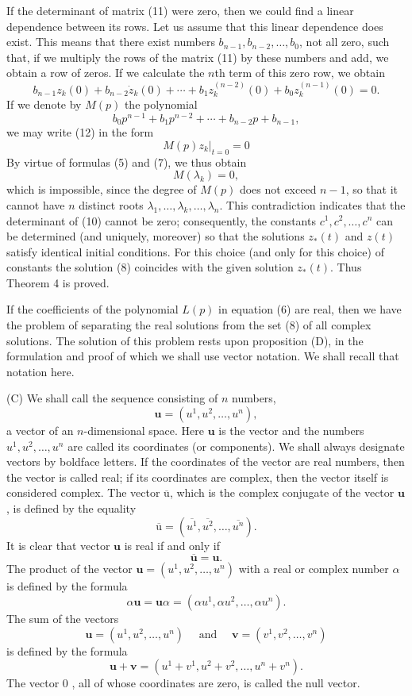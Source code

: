 \documentclass[10pt,a5paper]{book}
\makeatletter
\theoremstyle{plain}
\theoremstyle{definition}
\theoremstyle{remark}
\renewenvironment{proof}[1][\proofname]{\par
  \pushQED{\qed}%
  \normalfont\topsep6\p@\@plus6\p@\relax
  \trivlist
  \item\relax{\itshape #1\@addpunct{.}}\hspace\labelsep\ignorespaces
}{\popQED\endtrivlist\@endpefalse}
\makeatother
\begin{document}
\begin{proof}
If the determinant of matrix (11) were zero, then we could find a linear dependence between its rows. Let us assume that this linear dependence does exist. This means that there exist numbers $b_{n-1}, b_{n-2}, \ldots, b_{0}$, not all zero, such that, if we multiply the rows of the matrix (11) by these numbers and add, we obtain a row of zeros. If we calculate the $n$th term of this zero row, we obtain
\begin{equation*}
b_{n-1} z_{k}(0)+b_{n-2} \dot{z}_{k}(0)+\cdots+b_{1} z_{k}^{(n-2)}(0)+b_{0} z_{k}^{(n-1)}(0)=0 . \tag{12}
\end{equation*}
If we denote by $M(p)$ the polynomial
\[
b_{0} p^{n-1}+b_{1} p^{n-2}+\cdots+b_{n-2} p+b_{n-1},
\]
we may write (12) in the form
\[
\left.M(p) z_{k}\right|_{t=0}=0
\]
By virtue of formulas (5) and (7), we thus obtain
\[
M\left(\lambda_{k}\right)=0,
\]
which is impossible, since the degree of $M(p)$ does not exceed $n-1$, so that it cannot have $n$ distinct roots $\lambda_{1}, \ldots, \lambda_{k}, \ldots, \lambda_{n}$. This contradiction indicates that the determinant of (10) cannot be zero; consequently, the constants $c^{1}, c^{2}, \ldots, c^{n}$ can be determined (and uniquely, moreover) so that the solutions $z_{*}(t)$ and $z(t)$ satisfy identical initial conditions. For this choice (and only for this choice) of constants the solution (8) coincides with the given solution $z_{*}(t)$. Thus Theorem 4 is proved.
\end{proof}

If the coefficients of the polynomial $L(p)$ in equation (6) are real, then we have the problem of separating the real solutions from the set (8) of all complex solutions. The solution of this problem rests upon proposition (D), in the formulation and proof of which we shall use vector notation. We shall recall that notation here.

(C) We shall call the sequence consisting of $n$ numbers,
\[
\mathbf{u}=\left(u^{1}, u^{2}, \ldots, u^{n}\right),
\]
a vector of an $n$-dimensional space. Here $\mathbf{u}$ is the vector and the numbers $u^{1}, u^{2}, \ldots, u^{n}$ are called its coordinates (or components). We shall always designate vectors by boldface letters. If the coordinates of the vector are real numbers, then the vector is called real; if its coordinates are complex, then the vector itself is considered complex. The vector $\overline{\mathrm{u}}$, which is the complex conjugate of the vector $\mathbf{u}$, is defined by the equality
\[
\overline{\mathrm{u}}=\left(\overline{u^{1}}, \overline{u^{2}}, \ldots, \overline{u^{n}}\right) .
\]
It is clear that vector $\mathbf{u}$ is real if and only if
\[
\overline{\mathbf{u}}=\mathbf{u} .
\]
The product of the vector $\mathbf{u}=\left(u^{1}, u^{2}, \ldots, u^{n}\right)$ with a real or complex number $\alpha$ is defined by the formula
\[
\alpha \mathbf{u}=\mathbf{u} \alpha=\left(\alpha u^{1}, \alpha u^{2}, \ldots, \alpha u^{n}\right) .
\]
The sum of the vectors
\[
\mathbf{u}=\left(u^{1}, u^{2}, \ldots, u^{n}\right) \quad \text { and } \quad \mathbf{v}=\left(v^{1}, v^{2}, \ldots, v^{n}\right)
\]
is defined by the formula
\[
\mathbf{u}+\mathbf{v}=\left(u^{1}+v^{1}, u^{2}+v^{2}, \ldots, u^{n}+v^{n}\right) .
\]
The vector 0 , all of whose coordinates are zero, is called the null vector.
\end{document}
